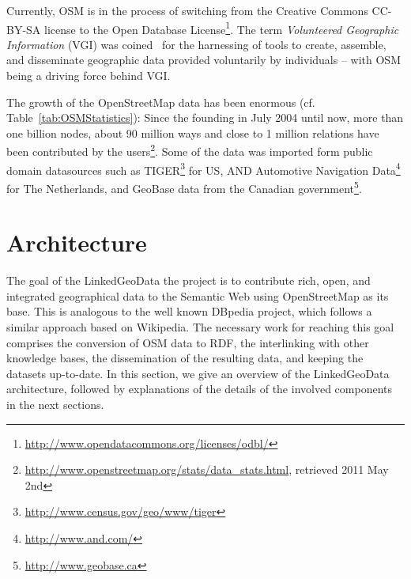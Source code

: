 Currently, OSM is in the process of switching from the Creative Commons CC-BY-SA license to the Open Database License\footnote{\url{http://www.opendatacommons.org/licenses/odbl/}}.
The term \textit{Volunteered Geographic Information} (VGI) was coined~\cite{michael2007citizens} for the harnessing of tools to create, assemble, and disseminate geographic data provided voluntarily by individuals -- with OSM being a driving force behind VGI.

The growth of the OpenStreetMap data has been enormous (cf. Table~\ref{tab:OSMStatistics}):
Since the founding in July 2004 until now, more than one billion nodes, about 90 million ways and close to 1 million relations have been contributed by the users\footnote{\url{http://www.openstreetmap.org/stats/data_stats.html}, retrieved 2011 May 2nd}.
Some of the data was imported form public domain datasources such as TIGER\footnote{\url{http://www.census.gov/geo/www/tiger}} for US, AND Automotive Navigation Data\footnote{\url{http://www.and.com/}} for The Netherlands, and GeoBase data from the Canadian government\footnote{\url{http://www.geobase.ca}}.

\section{Architecture}
\label{sec:architecture}

The goal of the LinkedGeoData the project is to contribute rich, open, and integrated geographical data to the Semantic Web using OpenStreetMap as its base.
This is analogous to the well known DBpedia project, which follows a similar approach based on Wikipedia.
The necessary work for reaching this goal comprises the conversion of OSM data to RDF, the interlinking with other knowledge bases, the dissemination of the resulting data, and keeping the datasets up-to-date.
In this section, we give an overview of the LinkedGeoData architecture, followed by explanations of the details of the involved components in the next sections.

